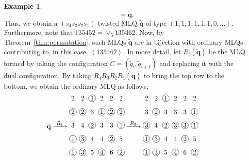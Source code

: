 \documentclass[reqno]{amsart}
\newcommand{\0}{\phantom{c}}
\newcommand{\swt}[1]{\left\langle #1 \right\rangle} %
\newcommand{\merge}[1]{\vee_{#1}} %
\newcommand{\qq}{\mathbf{q}}
\theoremstyle{plain}
\theoremstyle{definition}
\newtheorem{example}[thm]{Example}
\numberwithin{equation}{section}
\begin{document}
\begin{example}
\[= \widetilde{\qq}.
\]
Thus, we obtain a $(s_4 s_3 s_2 s_1)$-twisted MLQ $\widetilde{\qq}$ of type $(1, 1, 1, 1, 1, 1, 0, \ldots)$.
Furthermore, note that $135452 = \merge{5} 135462$.
Now, by Theorem~\ref{thm:permutation}, such MLQs $\widetilde{\qq}$ are in bijection with ordinary MLQs contributing to, in this case, $\swt{135462}$.
In more detail, let $R_i(\widetilde{\qq})$ be the MLQ formed by taking the configuration $C = (\widetilde{q}_i, \widetilde{q}_{i+1})$ and replacing it with the dual configuration.
By taking $R_4 R_3 R_2 R_1(\widetilde{\qq})$ to bring the top row to the bottom, we obtain the ordinary MLQ as follows:
\begin{align*}
\widetilde{\qq} & \xrightarrow[\hspace{15pt}]{R_1}
\begin{tikzpicture}[xscale=0.5,yscale=0.7,every node/.style={inner sep=0.8pt},baseline=55]
\node at (0, 5){2};\node at (1, 5){2};\node[circle, draw=black] at (2, 5){1};\node at (3, 5){2};\node at (4, 5){2};\node at (5, 5){2};\node[circle, draw=black] at (0, 4){2};\node[circle, draw=black] at (1, 4){2};\node at (2, 4){3};\node[circle, draw=black] at (3, 4){1};\node[circle, draw=black] at (4, 4){2};\node[circle, draw=black] at (5, 4){2};\node at (0, 3){3};\node at (1, 3){4};\node[circle, draw=black] at (2, 3){2};\node at (3, 3){3};\node at (4, 3){3};\node[circle, draw=black] at (5, 3){1};\node[circle, draw=black] at (0, 2){1};\node[circle, draw=black] at (1, 2){3};\node at (2, 2){4};\node at (3, 2){4};\node[circle, draw=black] at (4, 2){2};\node at (5, 2){5};\node[circle, draw=black] at (0, 1){1};\node[circle, draw=black] at (1, 1){3};\node at (2, 1){5};\node[circle, draw=black] at (3, 1){4};\node at (4, 1){6};\node[circle, draw=black] at (5, 1){2};
\end{tikzpicture}
\xrightarrow[\hspace{15pt}]{R_2}
\begin{tikzpicture}[xscale=0.5,yscale=0.7,every node/.style={inner sep=0.8pt},baseline=55]
\node at (0, 5){2};\node at (1, 5){2};\node[circle, draw=black] at (2, 5){1};\node at (3, 5){2};\node at (4, 5){2};\node at (5, 5){2};\node at (0, 4){3};\node[circle, draw=black] at (1, 4){2};\node at (2, 4){3};\node at (3, 4){3};\node at (4, 4){3};\node[circle, draw=black] at (5, 4){1};\node[circle, draw=black] at (0, 3){3};\node at (1, 3){4};\node[circle, draw=black] at (2, 3){2};\node[circle, draw=black] at (3, 3){3};\node[circle, draw=black] at (4, 3){3};\node[circle, draw=black] at (5, 3){1};\node[circle, draw=black] at (0, 2){1};\node[circle, draw=black] at (1, 2){3};\node at (2, 2){4};\node at (3, 2){4};\node[circle, draw=black] at (4, 2){2};\node at (5, 2){5};\node[circle, draw=black] at (0, 1){1};\node[circle, draw=black] at (1, 1){3};\node at (2, 1){5};\node[circle, draw=black] at (3, 1){4};\node at (4, 1){6};\node[circle, draw=black] at (5, 1){2};

\end{tikzpicture}
\end{align*}
\end{example}
\end{document}
